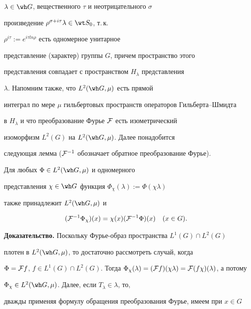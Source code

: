 $\lambda\in\wh G$, вещественного $\tau$ и неотрицательного $\sigma$


произведение $\rho^{\sigma +i\tau}\lambda\in\wt S_0$, т.\,к.


$\rho^{i\tau} := e^{i\tau ln\rho}$ есть одномерное унитарное


представление (характер) группы $G$, причем пространство этого


представления совпадает с пространством $H_\lambda$ представления


$\lambda$. Напомним также, что $L^2(\wh G,\mu)$ есть прямой


интеграл по мере $\mu$ гильбертовых пространств операторов Гильберта--Шмидта


в $H_\lambda$ и что преобразование Фурье ${\cal F}$ есть изометрический


изоморфизм $L^2(G)$ на $L^2(\wh G,\mu)$. Далее понадобится


следующая лемма (${\cal F}^{-1}$ обозначает обратное преобразование Фурье).





\begin{lemnonum}


Для любых $\Phi\in L^2(\wh G,\mu)$ и одномерного


представления $\chi\in \wh G$ функция $\Phi_\chi(\lambda)


:= \Phi(\chi\lambda)$


также принадлежит $L^2(\wh G,\mu)$ и


$$


({\cal F}^{-1}\Phi_\chi)(x) = \chi(x)({\cal F}^{-1}\Phi)(x)\quad(x\in G).


$$


\end{lemnonum}





{\bf Доказательство.} Поскольку Фурье-образ пространства $L^1(G)\cap L^2(G)$


плотен в $L^2(\wh G, \mu)$, то достаточно рассмотреть случай, когда


$\Phi = {\cal F}f$, $f\in L^1(G)\cap L^2(G)$. Тогда $\Phi_\chi(\lambda) =


({\cal F}f)(\chi\lambda) = {\cal F}(f\chi)(\lambda)$, а потому


$\Phi_\chi\in L^2(\wh G,\mu)$. Далее, если $T_\lambda\in \lambda$, то,


дважды применяя формулу обращения преобразования Фурье, имеем при $x\in G$


